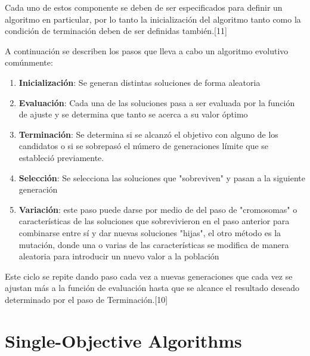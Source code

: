 Cada uno de estos componente se deben de ser especificados para definir un algoritmo en particular, por lo tanto la inicialización del algoritmo tanto como la condición de terminación deben de ser definidas también.[11]

A continuación se describen los pasos que lleva a cabo un algoritmo evolutivo comúnmente:

\begin{enumerate}
\item \textbf{Inicialización}: Se generan distintas soluciones de forma aleatoria
\item \textbf{Evaluación}: Cada una de las soluciones pasa a ser evaluada por la función de ajuste y se determina que tanto se acerca a su valor óptimo
\item \textbf{Terminación}: Se determina si se alcanzó el objetivo con alguno de los candidatos o si se sobrepasó el número de generaciones límite que se estableció previamente.
\item \textbf{Selección}: Se selecciona las soluciones que "sobreviven" y pasan a la siguiente generación
\item \textbf{Variación}: este paso puede darse por medio de del paso de "cromosomas" o características de las soluciones que sobrevivieron en el paso anterior para combinarse entre sí y dar nuevas soluciones "hijas", el otro método es la mutación, donde una o varias de las características se modifica de manera aleatoria para introducir un nuevo valor a la población
\end{enumerate}

Este ciclo se repite dando paso cada vez a nuevas generaciones que cada vez se ajustan más a la función de evaluación hasta que se alcance el resultado deseado determinado por el paso de Terminación.[10] \\

\section{Single-Objective Algorithms}


